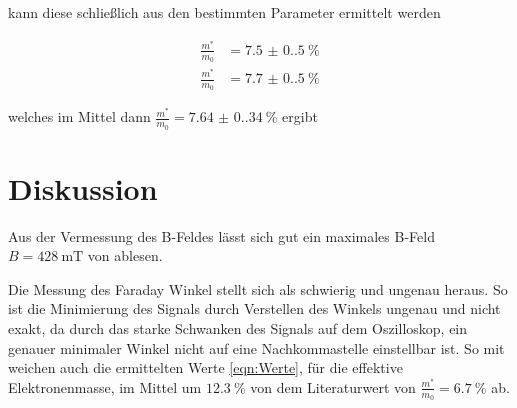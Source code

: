 kann diese schließlich aus den bestimmten Parameter ermittelt werden 

\begin{align}
    \frac{m^{\ast}}{m_0}&=\qty{7.5(0.5)}{\%}\\
    \frac{m^{\ast}}{m_0}&=\qty{7.7(0.5)}{\%}
    \label{eqn:Werte}
\end{align}

welches im Mittel dann $\frac{m^{\ast}}{m_0}=\qty{7.64(0.34)}{\%}$ ergibt


\section{Diskussion}
Aus der Vermessung des B-Feldes lässt sich gut ein maximales B-Feld $B=\qty{428}{\milli\tesla}$ von ablesen. 

Die Messung des Faraday Winkel stellt sich als schwierig und ungenau heraus. 
So ist die Minimierung des Signals durch Verstellen des Winkels ungenau und nicht exakt, 
da durch das starke Schwanken des Signals auf dem Oszilloskop, ein genauer minimaler Winkel nicht auf eine Nachkommastelle einstellbar ist. 
So mit weichen auch die ermittelten Werte \eqref{eqn:Werte}, für die effektive Elektronenmasse, 
im Mittel um $\qty{12.3}{\%}$ von dem Literaturwert von $\frac{m^{\ast}}{m_0}=\qty{6.7}{\%}$ \cite{web:GaAs} ab.


\newpage
\printbibliography

